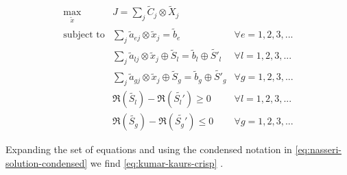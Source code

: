 \documentclass[ee,msthesis]{usuthesis}
\begin{document}
\begin{equation}
\label{eq:kumar-kaurs-fuzzy}
\begin{array}{lll}
\underset{{\tilde{x}}}{\text{max}} & J = \sum_j \tilde{C}_j \otimes \tilde{X}_j              &                                              \\
\text{subject to} & \sum_j \tilde{a}_{ej} \otimes \tilde{x}_j               = \tilde{b}_e & \forall e = 1,2,3,...                \\
                  & \sum_j \tilde{a}_{lj} \otimes \tilde{x}_j \oplus \tilde{S}_l = \tilde{b}_l \oplus \tilde{S'}_l & \forall l = 1,2,3,... \\
                  & \sum_j \tilde{a}_{gj} \otimes \tilde{x}_j \oplus \tilde{S}_g = \tilde{b}_g \oplus \tilde{S'}_g & \forall g = 1,2,3,... \\
                  & \mathfrak{R}(\tilde{S_l}) - \mathfrak{R}(\tilde{S_l'}) \ge 0                                     & \forall l = 1,2,3,...      \\
                  & \mathfrak{R}(\tilde{S_g}) - \mathfrak{R}(\tilde{S_g'}) \le 0                                     & \forall g = 1,2,3,...
\end{array}
\end{equation}

Expanding the set of equations and using the condensed notation in \ref{eq:nasseri-solution-condensed} we find
\ref{eq:kumar-kaurs-crisp} \cite{kaur-2016-introd-fuzzy}.
\end{document}
